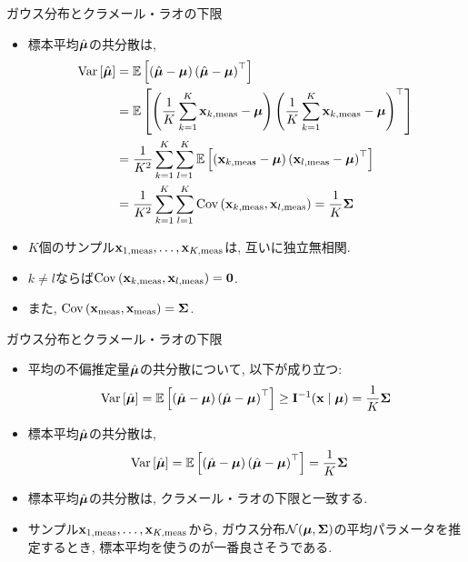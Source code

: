\documentclass[dvipdfmx,notheorems,t]{beamer}
\begin{document}
\begin{frame}{ガウス分布とクラメール・ラオの下限}
\begin{itemize}
  \item 標本平均$\hat{\vb*{\mu}}$の共分散は,
  {\small \begin{align*}
    \operatorname{Var} \left[ \hat{\vb*{\mu}} \right] &= \operatorname{\mathbb{E}} \left[ \left( \hat{\vb*{\mu}} - \vb*{\mu} \right)
      \left( \hat{\vb*{\mu}} - \vb*{\mu} \right)^\top \right] \\
      &= \operatorname{\mathbb{E}} \left[ \left( \frac{1}{K} \sum_{k = 1}^K \vb{x}_{k, \mathrm{meas}} - \vb*{\mu} \right)
        \left( \frac{1}{K} \sum_{k = 1}^K \vb{x}_{k, \mathrm{meas}} - \vb*{\mu} \right)^\top \right] \\
      &= \frac{1}{K^2} \sum_{k = 1}^K \sum_{l = 1}^K
        \operatorname{\mathbb{E}} \left[ \left( \vb{x}_{k, \mathrm{meas}} - \vb*{\mu} \right)
        \left( \vb{x}_{l, \mathrm{meas}} - \vb*{\mu} \right)^\top \right] \\
      &= \frac{1}{K^2} \sum_{k = 1}^K \sum_{l = 1}^K
        \operatorname{Cov} \left( \vb{x}_{k, \mathrm{meas}}, \vb{x}_{l, \mathrm{meas}} \right)
      = \frac{1}{K} \vb{\Sigma}
  \end{align*}}

  \item $K$個のサンプル$\vb{x}_{1, \mathrm{meas}}, \ldots, \vb{x}_{K, \mathrm{meas}}$は, 互いに独立無相関.
  \item $k \neq l$ならば$\operatorname{Cov} \left( \vb{x}_{k, \mathrm{meas}}, \vb{x}_{l, \mathrm{meas}} \right) = \vb{0}$.
  \item また, $\operatorname{Cov} \left( \vb{x}_\mathrm{meas}, \vb{x}_\mathrm{meas} \right) = \vb{\Sigma}$.
\end{itemize}
\end{frame}

\begin{frame}{ガウス分布とクラメール・ラオの下限}
\begin{itemize}
  \item 平均の不偏推定量$\hat{\vb*{\mu}}$の共分散について, 以下が成り立つ:
  \begin{align*}
    \operatorname{Var} \left[ \hat{\vb*{\mu}} \right] = \operatorname{\mathbb{E}} \left[ \left( \hat{\vb*{\mu}} - \vb*{\mu} \right)
      \left( \hat{\vb*{\mu}} - \vb*{\mu} \right)^\top \right]
      \ge \vb{I}^{-1}(\vb{x} \mid \vb*{\mu}) = \frac{1}{K} \vb{\Sigma}
  \end{align*}
  \item 標本平均$\hat{\vb*{\mu}}$の共分散は,
  \begin{align*}
    \operatorname{Var} \left[ \hat{\vb*{\mu}} \right] &= \operatorname{\mathbb{E}} \left[ \left( \hat{\vb*{\mu}} - \vb*{\mu} \right)
      \left( \hat{\vb*{\mu}} - \vb*{\mu} \right)^\top \right]
      = \frac{1}{K} \vb{\Sigma}
  \end{align*}
  \item 標本平均$\hat{\vb*{\mu}}$の共分散は, クラメール・ラオの下限と一致する.
  \item サンプル$\vb{x}_{1, \mathrm{meas}}, \ldots, \vb{x}_{K, \mathrm{meas}}$から,
  ガウス分布$\mathcal{N}(\vb*{\mu}, \vb{\Sigma})$の平均パラメータを推定するとき,
  標本平均を使うのが一番良さそうである.
\end{itemize}
\end{frame}
\end{document}
